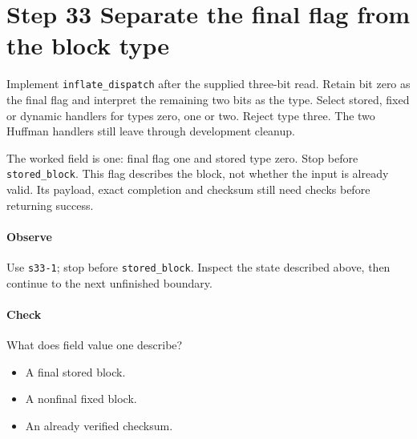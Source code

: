 \section{Step 33 Separate the final flag from the block type}\label{png-inflate-s33}
Implement \texttt{inflate\_dispatch} after the supplied three-bit read. Retain bit zero as the final flag and interpret the remaining two bits as the type. Select stored, fixed or dynamic handlers for types zero, one or two. Reject type three. The two Huffman handlers still leave through development cleanup.

The worked field is one: final flag one and stored type zero. Stop before \texttt{stored\_block}. This flag describes the block, not whether the input is already valid. Its payload, exact completion and checksum still need checks before returning success.

\paragraph{Observe} Use \texttt{s33-1}; stop before \texttt{stored\_block}. Inspect the state described above, then continue to the next unfinished boundary.

\paragraph{Check} What does field value one describe?
\begin{itemize}
  \item[A.] A final stored block.
  \item[B.] A nonfinal fixed block.
  \item[C.] An already verified checksum.
\end{itemize}
